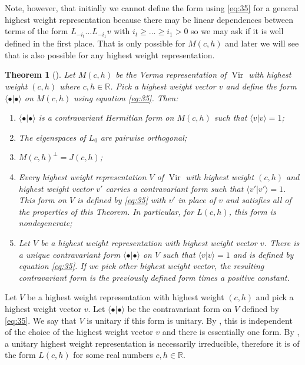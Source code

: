 \documentclass[a4paper, 12pt, reqno]{amsart}
\newtheorem{theorem}{Theorem}[subsection]
\theoremstyle{remark}
\numberwithin{equation}{subsection}
\DeclareMathOperator{\Vir}{Vir}
\begin{document}
Note, however, that initially we cannot define the form using \eqref{eq:35} for a general highest weight representation because there may be linear dependences between terms of the form $L_{-i_t}\dots L_{-i_1}v$ with $i_t \ge \dots \ge i_1 > 0$ so we may ask if it is well defined in the first place.
That is only possible for $M(c, h)$ and later we will see that is also possible for any highest weight representation.

\begin{theorem}[{\cite[Proposition 3.4]{kac_bombay_2013}}]
  \label{thr:25}
  Let $M(c, h)$ be the Verma representation of $\Vir$ with highest weight $(c, h)$ where $c, h \in \mathbb{R}$.
  Pick a highest weight vector $v$ and define the form $\langle \bullet| \bullet\rangle$ on $M(c, h)$ using equation \eqref{eq:35}.
  Then:
  \begin{enumerate}
  \item $\langle \bullet| \bullet\rangle$ is a contravariant Hermitian form on $M(c, h)$ such that $\langle v| v\rangle = 1$;
  \item The eigenspaces of $L_0$ are pairwise orthogonal;
  \item $M(c, h)^{\perp} = J(c, h)$;
  \item Every highest weight representation $V$ of $\Vir$ with highest weight $(c, h)$ and highest weight vector $v'$ carries a contravariant form such that $\langle v'| v'\rangle = 1$.
    This form on $V$ is defined by \eqref{eq:35} with $v'$ in place of $v$ and satisfies all of the properties of this Theorem.
    In particular, for $L(c, h)$, this form is nondegenerate;
  \item Let $V$ be a highest weight representation with highest weight vector $v$.
    There is a unique contravariant form $\langle \bullet| \bullet\rangle$ on $V$ such that $\langle v| v\rangle = 1$ and is defined by equation \eqref{eq:35}.
    If we pick other highest weight vector, the resulting contravariant form is the previously defined form times a positive constant.
  \end{enumerate}
\end{theorem}

Let $V$ be a highest weight representation with highest weight $(c, h)$ and pick a highest weight vector $v$.
Let $\langle \bullet| \bullet\rangle$ be the contravariant form on $V$ defined by \eqref{eq:35}.
We say that $V$ is unitary if this form is unitary.
By , this is independent of the choice of the highest weight vector $v$ and there is essentially one form.
By , a unitary highest weight representation is necessarily irreducible, therefore it is of the form $L(c, h)$ for some real numbers $c, h \in \mathbb{R}$.
\end{document}
